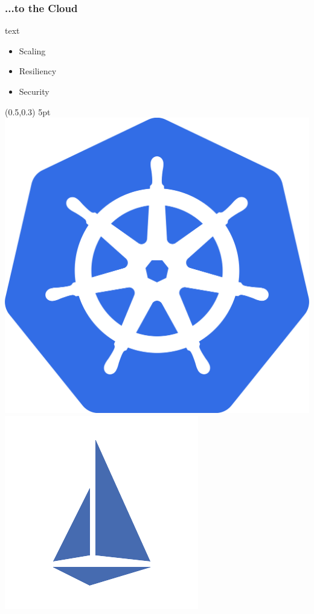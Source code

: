\documentclass[aspectratio=169,11pt,hyperref={colorlinks=true}]{beamer}
\begin{document}
\begin{lblackrwhiteframe}
  \frametitle{...to the Cloud}
  \large
  \begin{beamercolorbox}[wd=0.3\paperwidth]{text}
    \begin{itemize}
      \item Scaling
      \item Resiliency
      \item Security
    \end{itemize}
  \end{beamercolorbox}%
  \begin{textblock*}{0.5\paperwidth}(0.5\paperwidth,0.3\paperheight)
    \centering
    \hfill{5pt}
    \includegraphics[width=0.22\paperwidth]{img/kubernetes.png}
    \includegraphics[width=0.22\paperwidth]{img/istio.png}
  \end{textblock*}
\end{lblackrwhiteframe}
\end{document}
